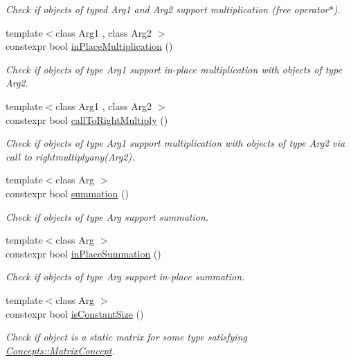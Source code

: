 \begin{DoxyCompactItemize}
\begin{DoxyCompactList}\small\item\em Check if objects of typed Arg1 and Arg2 support multiplication (free operator$\ast$). \end{DoxyCompactList}\item 
{\footnotesize template$<$class Arg1 , class Arg2 $>$ }\\constexpr bool \hyperlink{namespaceFunG_1_1Checks_abeeb72e6dc640672187145a0469da9cc}{in\+Place\+Multiplication} ()
\begin{DoxyCompactList}\small\item\em Check if objects of type Arg1 support in-\/place multiplication with objects of type Arg2. \end{DoxyCompactList}\item 
{\footnotesize template$<$class Arg1 , class Arg2 $>$ }\\constexpr bool \hyperlink{namespaceFunG_1_1Checks_a3874c9f52b64baa8ed9a87b9902eb54c}{call\+To\+Right\+Multiply} ()
\begin{DoxyCompactList}\small\item\em Check if objects of type Arg1 support multiplication with objects of type Arg2 via call to rightmultiplyany(\+Arg2). \end{DoxyCompactList}\item 
{\footnotesize template$<$class Arg $>$ }\\constexpr bool \hyperlink{namespaceFunG_1_1Checks_a2dd2bf4016317339c1a609ddda1f4915}{summation} ()
\begin{DoxyCompactList}\small\item\em Check if objects of type Arg support summation. \end{DoxyCompactList}\item 
{\footnotesize template$<$class Arg $>$ }\\constexpr bool \hyperlink{namespaceFunG_1_1Checks_a9ff694f025cc9f2ff379b1f3833641bb}{in\+Place\+Summation} ()
\begin{DoxyCompactList}\small\item\em Check if objects of type Arg support in-\/place summation. \end{DoxyCompactList}\item 
{\footnotesize template$<$class Arg $>$ }\\constexpr bool \hyperlink{namespaceFunG_1_1Checks_adcc3e179af2ed0384a3773ea086045b9}{is\+Constant\+Size} ()
\begin{DoxyCompactList}\small\item\em Check if object is a static matrix for some type satisfying \hyperlink{structFunG_1_1Concepts_1_1MatrixConcept}{Concepts\+::\+Matrix\+Concept}. \end{DoxyCompactList}\item 

\end{DoxyCompactItemize}

